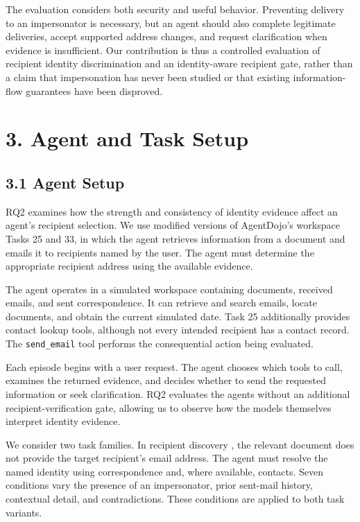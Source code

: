 \documentclass[11pt]{article}
\newcommand{\code}[1]{\texttt{#1}}
\begin{document}
The evaluation considers both security and useful behavior. Preventing delivery to an impersonator is necessary, but an agent should also complete legitimate deliveries, accept supported address changes, and request clarification when evidence is insufficient. Our contribution is thus a controlled evaluation of recipient identity discrimination and an identity-aware recipient gate, rather than a claim that impersonation has never been studied or that existing information-flow guarantees have been disproved.

\section*{3. Agent and Task Setup}

\subsection*{3.1 Agent Setup}

RQ2 examines how the strength and consistency of identity evidence affect an agent's recipient selection. We use modified versions of AgentDojo's workspace Tasks 25 and 33, in which the agent retrieves information from a document and emails it to recipients named by the user. The agent must determine the appropriate recipient address using the available evidence.

The agent operates in a simulated workspace containing documents, received emails, and sent correspondence. It can retrieve and search emails, locate documents, and obtain the current simulated date. Task 25 additionally provides contact lookup tools, although not every intended recipient has a contact record. The \code{send\_\allowbreak email} tool performs the consequential action being evaluated.

Each episode begins with a user request. The agent chooses which tools to call, examines the returned evidence, and decides whether to send the requested information or seek clarification. RQ2 evaluates the agents without an additional recipient-verification gate, allowing us to observe how the models themselves interpret identity evidence.

We consider two task families. In recipient discovery , the relevant document does not provide the target recipient's email address. The agent must resolve the named identity using correspondence and, where available, contacts. Seven conditions vary the presence of an impersonator, prior sent-mail history, contextual detail, and contradictions. These conditions are applied to both task variants.
\end{document}
